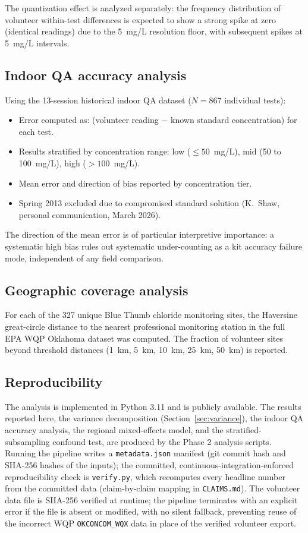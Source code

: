 \documentclass[lineno]{wlpeerj}
\begin{document}
The quantization effect is analyzed separately: the frequency distribution of volunteer within-test differences is expected to show a strong spike at zero (identical readings) due to the 5~mg/L resolution floor, with subsequent spikes at 5~mg/L intervals.

\subsection{Indoor QA accuracy analysis}

Using the 13-session historical indoor QA dataset ($N=867$ individual tests):

\begin{itemize}
  \item Error computed as: (volunteer reading $-$ known standard concentration) for each test.
  \item Results stratified by concentration range: low ($\leq 50$~mg/L), mid (50 to 100~mg/L), high ($> 100$~mg/L).
  \item Mean error and direction of bias reported by concentration tier.
  \item Spring 2013 excluded due to compromised standard solution (K.\ Shaw, personal communication, March 2026).
\end{itemize}

The direction of the mean error is of particular interpretive importance: a systematic high bias rules out systematic under-counting as a kit accuracy failure mode, independent of any field comparison.

\subsection{Geographic coverage analysis}
\label{sec:coveragemethod}

For each of the 327 unique Blue Thumb chloride monitoring sites, the Haversine great-circle distance to the nearest professional monitoring station in the full EPA WQP Oklahoma dataset was computed. The fraction of volunteer sites beyond threshold distances (1~km, 5~km, 10~km, 25~km, 50~km) is reported.

\subsection{Reproducibility}

The analysis is implemented in Python 3.11 and is publicly available. The results reported here, the variance decomposition (Section~\ref{sec:variance}), the indoor QA accuracy analysis, the regional mixed-effects model, and the stratified-subsampling confound test, are produced by the Phase 2 analysis scripts. Running the pipeline writes a \texttt{metadata.json} manifest (git commit hash and SHA-256 hashes of the inputs); the committed, continuous-integration-enforced reproducibility check is \texttt{verify.py}, which recomputes every headline number from the committed data (claim-by-claim mapping in \texttt{CLAIMS.md}). The volunteer data file is SHA-256 verified at runtime; the pipeline terminates with an explicit error if the file is absent or modified, with no silent fallback, preventing reuse of the incorrect WQP \texttt{OKCONCOM\_WQX} data in place of the verified volunteer export.
\end{document}
